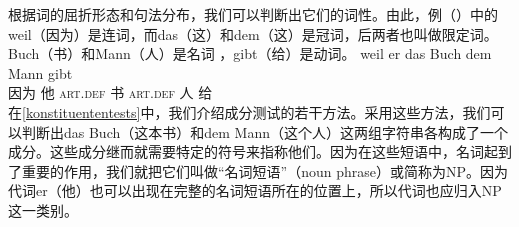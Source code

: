 根据词的屈折形态和句法分布，我们可以判断出它们的词性。由此，例（）中的weil（因为）是连词，而das（这）和dem（这）是冠词，后两者也叫做限定词。Buch（书）和Mann（人）是名词 ，gibt（给）是动词。
\ea\label{bsp-weil-er-das-buch-dem-mann-gibt}
\gll weil er das Buch dem Mann gibt\\
	 因为 他 \textsc{art}.\textsc{def} 书 \textsc{art}.\textsc{def} 人 给\\
\z
在\ref{konstituententests}中，我们介绍成分测试的若干方法。采用这些方法，我们可以判断出das Buch（这本书）和dem Mann（这个人）这两组字符串各构成了一个成分。这些成分继而就需要特定的符号来指称他们。因为在这些短语中，名词起到了重要的作用，我们就把它们叫做“名词短语”（noun phrase）或简称为NP。因为代词er（他）也可以出现在完整的名词短语所在的位置上，所以代词也应归入NP这一类别。

